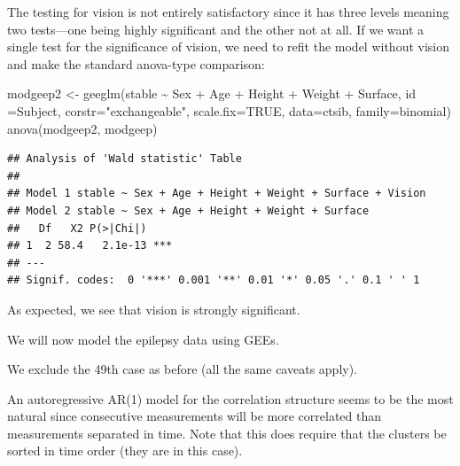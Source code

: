 \documentclass[
  ignorenonframetext,
]{beamer}
\newenvironment{Shaded}{\begin{snugshade}}{\end{snugshade}}
\newcommand{\AttributeTok}[1]{\textcolor[rgb]{0.77,0.63,0.00}{#1}}
\newcommand{\ConstantTok}[1]{\textcolor[rgb]{0.00,0.00,0.00}{#1}}
\newcommand{\FunctionTok}[1]{\textcolor[rgb]{0.00,0.00,0.00}{#1}}
\newcommand{\NormalTok}[1]{#1}
\newcommand{\OtherTok}[1]{\textcolor[rgb]{0.56,0.35,0.01}{#1}}
\newcommand{\SpecialCharTok}[1]{\textcolor[rgb]{0.00,0.00,0.00}{#1}}
\newcommand{\StringTok}[1]{\textcolor[rgb]{0.31,0.60,0.02}{#1}}
\begin{document}
\begin{frame}[fragile]{}
\protect\hypertarget{section-24}{}
The testing for vision is not entirely satisfactory since it has three
levels meaning two tests---one being highly significant and the other
not at all. If we want a single test for the significance of vision, we
need to refit the model without vision and make the standard anova-type
comparison:

\vspace{12pt}
\tiny

\begin{Shaded}
\begin{Highlighting}[]
\NormalTok{modgeep2 }\OtherTok{\textless{}{-}} \FunctionTok{geeglm}\NormalTok{(stable }\SpecialCharTok{\textasciitilde{}}\NormalTok{ Sex }\SpecialCharTok{+}\NormalTok{ Age }\SpecialCharTok{+}\NormalTok{ Height }\SpecialCharTok{+}\NormalTok{ Weight }\SpecialCharTok{+}\NormalTok{ Surface,}
  \AttributeTok{id =}\NormalTok{Subject, }\AttributeTok{corstr=}\StringTok{"exchangeable"}\NormalTok{, }\AttributeTok{scale.fix=}\ConstantTok{TRUE}\NormalTok{, }\AttributeTok{data=}\NormalTok{ctsib, }
  \AttributeTok{family=}\NormalTok{binomial)}
\FunctionTok{anova}\NormalTok{(modgeep2, modgeep)}
\end{Highlighting}
\end{Shaded}

\begin{verbatim}
## Analysis of 'Wald statistic' Table
## 
## Model 1 stable ~ Sex + Age + Height + Weight + Surface + Vision 
## Model 2 stable ~ Sex + Age + Height + Weight + Surface
##   Df   X2 P(>|Chi|)    
## 1  2 58.4   2.1e-13 ***
## ---
## Signif. codes:  0 '***' 0.001 '**' 0.01 '*' 0.05 '.' 0.1 ' ' 1
\end{verbatim}

\vspace{12pt}
\normalsize

As expected, we see that vision is strongly significant.
\end{frame}

\begin{frame}{}
\protect\hypertarget{section-25}{}
We will now model the epilepsy data using GEEs.

We exclude the 49th case as before (all the same caveats apply).

An autoregressive AR(1) model for the correlation structure seems to be
the most natural since consecutive measurements will be more correlated
than measurements separated in time. Note that this does require that
the clusters be sorted in time order (they are in this case).
\end{frame}
\end{document}
